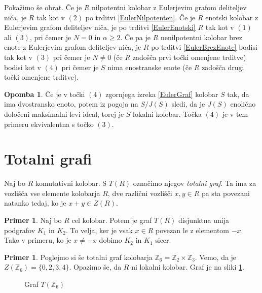 \documentclass[a4paper, 12pt]{amsart}
\theoremstyle{definition} %
\newtheorem{primer}[definicija]{Primer}
\newtheorem{opomba}[definicija]{Opomba}
\theoremstyle{plain} %
\newcommand{\Z}{\mathbb Z}
\begin{document}
Pokažimo še obrat. 
Če je $R$ nilpotentni kolobar z Eulerjevim grafom deliteljev niča, je $R$ tak kot v $(2)$ po trditvi \ref{EulerNilpotenten}. Če je $R$ enotski kolobar z Eulerjevim grafom deliteljev niča, je po trditvi \ref{EulerEnotski} $R$ tak kot v $(1)$ ali $(3)$, pri čemer je $N=0$ in $\alpha \ge 2$. Če pa je $R$ nenilpotentni kolobar brez enote z Eulerjevim grafom deliteljev niča, je $R$ po trditvi \ref{EulerBrezEnote} bodisi tak kot v $(3)$ pri čemer je $N\neq 0$ (če $R$ zadošča prvi točki omenjene trditve) bodisi kot v $(4)$ pri čemer je $S$ nima enostranske enote (če $R$ zadošča drugi točki omenjene trditve). 

\endproof

\begin{opomba}
Če je v točki $(4)$ zgornjega izreka \ref{EulerGraf} kolobar $S$ tak, da ima dvostransko enoto, potem iz pogoja na $S/J(S)$ sledi, da je $J(S)$ enolično določeni maksimalni levi ideal, torej je $S$ lokalni kolobar. Točka $(4)$  je v tem primeru ekvivalentna s točko $(3)$.
\end{opomba}

\section{Totalni grafi}

Naj bo $R$ komutativni kolobar. S $T(R)$ označimo njegov \emph{totalni graf}. Ta ima za vozlišča vse elemente kolobarja $R$, dve različni vozlišči $x,y\in R$ pa sta povezani natanko tedaj, ko je $x+y\in Z(R)$.

\begin{primer}
Naj bo $R$ cel kolobar. Potem je graf $T(R)$ disjunktna unija podgrafov $K_1$ in $K_2$. To velja, ker je vsak $x\in R$ povezan le z elementom $-x$. Tako v primeru, ko je $x\neq -x$  dobimo $K_2$ in $K_1$ sicer. 
\end{primer}

\begin{primer}
Poglejmo si še totalni graf kolobarja $\Z_6 = \Z_2 \times \Z_3$. Vemo, da je $Z(\Z_6) = \{0,2,3,4\}$.  Opazimo še, da $R$ ni lokalni kolobar. Graf je na sliki \ref{T(Z2xZ3)}.
\end{primer}

\begin{figure}[h!]
\centering

\caption{Graf $T(\Z_6)$}
\label{T(Z2xZ3)}
\end{figure}
\end{document}
